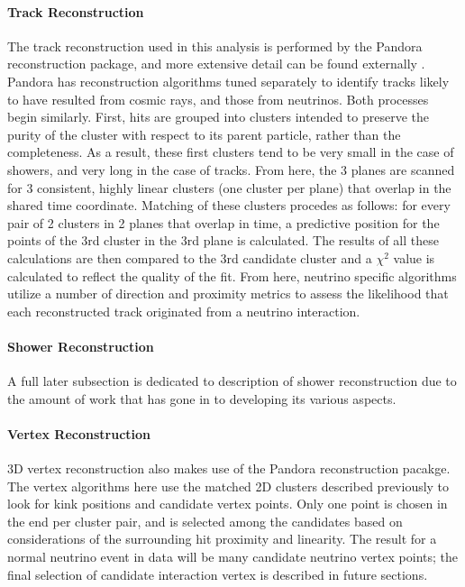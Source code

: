 \documentclass[12pt]{article}
\begin{document}
\paragraph{Track Reconstruction}
The track reconstruction used in this analysis is performed by the Pandora reconstruction package, and more extensive detail can be found externally \cite{bib:pandora}.  Pandora has reconstruction algorithms tuned separately to identify tracks likely to have resulted from cosmic rays, and those from neutrinos. Both processes begin similarly.  First, hits are grouped into clusters intended to preserve the purity of the cluster with respect to its parent particle, rather than the completeness.  As a result, these first clusters tend to be very small in the case of showers, and very long in the case of tracks.  From here, the 3 planes are scanned for 3 consistent, highly linear clusters (one cluster per plane) that overlap in the shared time coordinate.  Matching of these clusters procedes as follows:  for every pair of 2 clusters in 2 planes that overlap in time, a predictive position for the points of the 3rd cluster in the 3rd plane is calculated. The results of all these calculations are then compared to the 3rd candidate cluster and a $\chi^2$ value is calculated to reflect the quality of the fit. From here, neutrino specific algorithms utilize a number of direction and proximity metrics to assess the likelihood that each reconstructed track originated from a neutrino interaction. 

\paragraph{Shower Reconstruction}
A full later subsection is dedicated to description of shower reconstruction due to the amount of work that has gone in to developing its various aspects.

\paragraph{Vertex Reconstruction}
3D vertex reconstruction also makes use of the Pandora reconstruction pacakge. The vertex algorithms here use the matched 2D clusters described previously to look for kink positions and candidate vertex points. Only one point is chosen in the end per cluster pair, and is selected among the candidates based on considerations of the surrounding hit proximity and linearity. The result for a normal neutrino event in data will be many candidate neutrino vertex points; the final selection of candidate interaction vertex is described in future sections.
\end{document}
